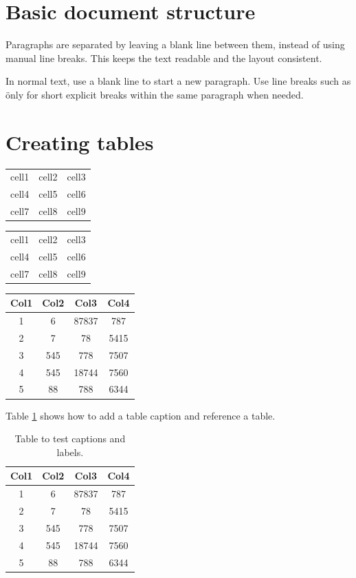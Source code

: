 \documentclass[12pt, letterpaper]{article}
\begin{document}
\section{Basic document structure}

Paragraphs are separated by leaving a blank line between them, instead of using manual line breaks. This keeps the text readable and the layout consistent.

In normal text, use a blank line to start a new paragraph. Use line breaks such as \\\" only for short explicit breaks within the same paragraph when needed.

\section{Creating tables}

\begin{center}
\begin{tabular}{c c c}
 cell1 & cell2 & cell3 \\
 cell4 & cell5 & cell6 \\
 cell7 & cell8 & cell9
\end{tabular}
\end{center}

\begin{center}
\begin{tabular}{|c|c|c|}
 \hline
 cell1 & cell2 & cell3 \\
 cell4 & cell5 & cell6 \\
 cell7 & cell8 & cell9 \\
 \hline
\end{tabular}
\end{center}

\begin{center}
 \begin{tabular}{cccc}
 \toprule
 Col1 & Col2 & Col3 & Col4 \\
 \midrule
 1 & 6 & 87837 & 787 \\
 2 & 7 & 78 & 5415 \\
 3 & 545 & 778 & 7507 \\
 4 & 545 & 18744 & 7560 \\
 5 & 88 & 788 & 6344 \\
 \bottomrule
\end{tabular}
\end{center}

Table \ref{table:data} shows how to add a table caption and reference a table.
\begin{table}[h!]
\centering
\begin{tabular}{cccc}
 \toprule
 Col1 & Col2 & Col3 & Col4 \\
 \midrule
 1 & 6 & 87837 & 787 \\
 2 & 7 & 78 & 5415 \\
 3 & 545 & 778 & 7507 \\
 4 & 545 & 18744 & 7560 \\
 5 & 88 & 788 & 6344 \\
 \bottomrule
\end{tabular}
\caption{Table to test captions and labels.}
\label{table:data}
\end{table}
\end{document}
